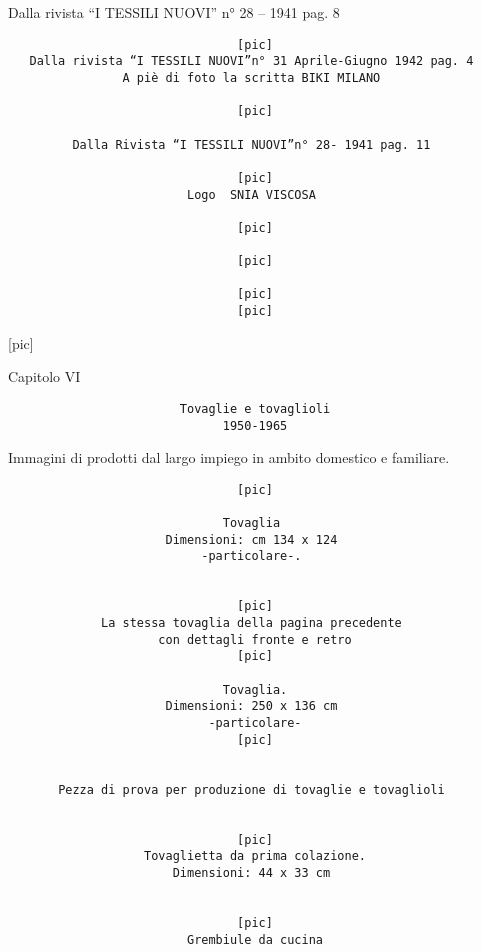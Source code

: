 Dalla rivista ``I TESSILI NUOVI'' n° 28 -- 1941 pag. 8

\begin{verbatim}
                                [pic]
   Dalla rivista “I TESSILI NUOVI”n° 31 Aprile-Giugno 1942 pag. 4
                A piè di foto la scritta BIKI MILANO

                                [pic]

         Dalla Rivista “I TESSILI NUOVI”n° 28- 1941 pag. 11

                                [pic]
                         Logo  SNIA VISCOSA

                                [pic]

                                [pic]

                                [pic]
                                [pic]
\end{verbatim}

{[}pic{]}

Capitolo VI

\begin{verbatim}
                        Tovaglie e tovaglioli
                              1950-1965
\end{verbatim}

Immagini di prodotti dal largo impiego in ambito domestico e familiare.

\begin{verbatim}
                                [pic]

                              Tovaglia
                      Dimensioni: cm 134 x 124
                           -particolare-.


                                [pic]
             La stessa tovaglia della pagina precedente
                     con dettagli fronte e retro
                                [pic]

                              Tovaglia.
                      Dimensioni: 250 x 136 cm
                            -particolare-
                                [pic]


       Pezza di prova per produzione di tovaglie e tovaglioli


                                [pic]
                   Tovaglietta da prima colazione.
                       Dimensioni: 44 x 33 cm


                                [pic]
                         Grembiule da cucina
\end{verbatim}

